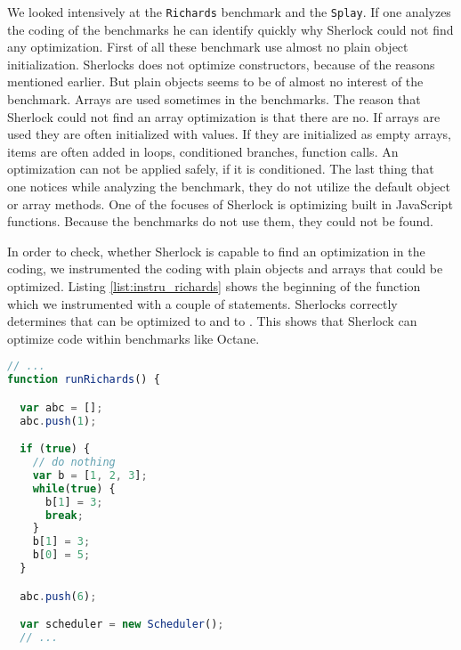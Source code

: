 We looked intensively at the \texttt{Richards} benchmark and the \texttt{Splay}. If 
one analyzes the coding of the benchmarks he can identify quickly why Sherlock could
 not find any optimization. First of all these benchmark use almost no plain object
 initialization. Sherlocks does not optimize constructors, because of the reasons 
 mentioned earlier. But plain objects seems to be of almost no interest of the benchmark.
Arrays are used sometimes in the benchmarks. The reason that Sherlock could not find
 an array optimization is that there are no. If arrays are used they are often initialized
 with values. If they are initialized as empty arrays, items are often added in loops, 
 conditioned branches, function calls. An optimization can not be applied safely, if
 it is conditioned. The last thing that one notices while analyzing the benchmark, 
 they do not utilize the default object or array methods. One of the focuses of 
 Sherlock is optimizing built in JavaScript functions. Because the benchmarks do
 not use them, they could not be found.

In order to check, whether Sherlock is capable to find an optimization in the coding,
 we instrumented the coding with plain objects and arrays that could be optimized. 
 Listing \ref{list:instru_richards} shows the beginning of the function 
 which we instrumented with a couple of statements. Sherlocks correctly determines that
  can be optimized to \js{[1, 6]} and  to \js{[5, 2, 3]}. This shows that 
 Sherlock can optimize code within benchmarks like Octane.

\begin{lstlisting}[caption=Richards,label=list:instru_richards,language=Javascript]
// ...
function runRichards() {

  var abc = [];
  abc.push(1);

  if (true) {
    // do nothing
    var b = [1, 2, 3];
    while(true) {
      b[1] = 3;
      break;
    }
    b[1] = 3;
    b[0] = 5;
  }

  abc.push(6);

  var scheduler = new Scheduler();
  // ...
\end{lstlisting}

